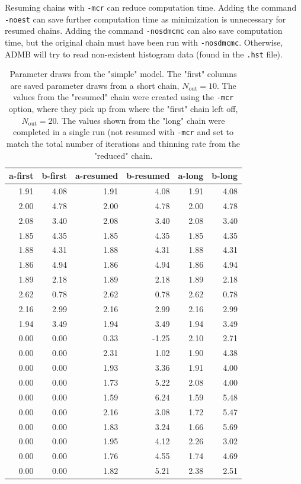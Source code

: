 \documentclass{article}\usepackage[]{graphicx}\usepackage[]{color}
\begin{document}
Resuming chains with \texttt{-mcr} can reduce computation time. Adding the
command \texttt{-noest} can save further computation time as minimization
is unnecessary for resumed chains. Adding the command \texttt{-nosdmcmc}
can also save computation time, but the original chain must have been run
with \texttt{-nosdmcmc}. Otherwise, ADMB will try to read non-existent
histogram data (found in the \texttt{.hst} file).

\begin{table}[ht]
\centering
\begin{tabular}{rrrrrr}
  \hline
  a-first & b-first & a-resumed & b-resumed & a-long & b-long \\
  \hline
  1.91 & 4.08 & 1.91 & 4.08 & 1.91 & 4.08 \\
  2.00 & 4.78 & 2.00 & 4.78 & 2.00 & 4.78 \\
  2.08 & 3.40 & 2.08 & 3.40 & 2.08 & 3.40 \\
  1.85 & 4.35 & 1.85 & 4.35 & 1.85 & 4.35 \\
  1.88 & 4.31 & 1.88 & 4.31 & 1.88 & 4.31 \\
  1.86 & 4.94 & 1.86 & 4.94 & 1.86 & 4.94 \\
  1.89 & 2.18 & 1.89 & 2.18 & 1.89 & 2.18 \\
  2.62 & 0.78 & 2.62 & 0.78 & 2.62 & 0.78 \\
  2.16 & 2.99 & 2.16 & 2.99 & 2.16 & 2.99 \\
  1.94 & 3.49 & 1.94 & 3.49 & 1.94 & 3.49 \\
  0.00 & 0.00 & 0.33 & -1.25 & 2.10 & 2.71 \\
  0.00 & 0.00 & 2.31 & 1.02 & 1.90 & 4.38 \\
  0.00 & 0.00 & 1.93 & 3.36 & 1.91 & 4.00 \\
  0.00 & 0.00 & 1.73 & 5.22 & 2.08 & 4.00 \\
  0.00 & 0.00 & 1.59 & 6.24 & 1.59 & 5.48 \\
  0.00 & 0.00 & 2.16 & 3.08 & 1.72 & 5.47 \\
  0.00 & 0.00 & 1.83 & 3.24 & 1.66 & 5.69 \\
  0.00 & 0.00 & 1.95 & 4.12 & 2.26 & 3.02 \\
  0.00 & 0.00 & 1.76 & 4.55 & 1.74 & 4.69 \\
  0.00 & 0.00 & 1.82 & 5.21 & 2.38 & 2.51 \\
   \hline
\end{tabular}
\caption{Parameter draws from the "simple" model. The "first" columns are saved
parameter draws from a short chain, $N_\text{out}=10$. The values from the "resumed" chain
were created using the \texttt{-mcr} option, where they pick up from where the
"first" chain left off, $N_\text{out}=20$. The values shown from the "long" chain
were completed in a single run (not resumed with \texttt{-mcr} and set to match
the total number of iterations and thinning rate from the "reduced" chain.}
\label{tab:mcr}
\end{table}
\end{document}
